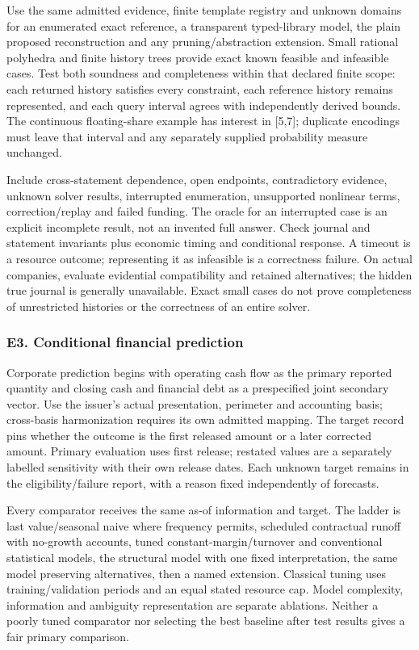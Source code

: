 Use the same admitted evidence, finite template registry and unknown domains for an enumerated exact reference, a transparent typed-library model, the plain proposed reconstruction and any pruning/abstraction extension. Small rational polyhedra and finite history trees provide exact known feasible and infeasible cases. Test both soundness and completeness within that declared finite scope: each returned history satisfies every constraint, each reference history remains represented, and each query interval agrees with independently derived bounds. The continuous floating-share example has interest in {[}5,7{]}; duplicate encodings must leave that interval and any separately supplied probability measure unchanged.

Include cross-statement dependence, open endpoints, contradictory evidence, unknown solver results, interrupted enumeration, unsupported nonlinear terms, correction/replay and failed funding. The oracle for an interrupted case is an explicit incomplete result, not an invented full answer. Check journal and statement invariants plus economic timing and conditional response. A timeout is a resource outcome; representing it as infeasible is a correctness failure. On actual companies, evaluate evidential compatibility and retained alternatives; the hidden true journal is generally unavailable. Exact small cases do not prove completeness of unrestricted histories or the correctness of an entire solver.

\hypertarget{e3.-conditional-financial-prediction}{%
\subsubsection{E3. Conditional financial prediction}\label{e3.-conditional-financial-prediction}}

Corporate prediction begins with operating cash flow as the primary reported quantity and closing cash and financial debt as a prespecified joint secondary vector. Use the issuer's actual presentation, perimeter and accounting basis; cross-basis harmonization requires its own admitted mapping. The target record pins whether the outcome is the first released amount or a later corrected amount. Primary evaluation uses first release; restated values are a separately labelled sensitivity with their own release dates. Each unknown target remains in the eligibility/failure report, with a reason fixed independently of forecasts.

Every comparator receives the same as-of information and target. The ladder is last value/seasonal naive where frequency permits, scheduled contractual runoff with no-growth accounts, tuned constant-margin/turnover and conventional statistical models, the structural model with one fixed interpretation, the same model preserving alternatives, then a named extension. Classical tuning uses training/validation periods and an equal stated resource cap. Model complexity, information and ambiguity representation are separate ablations. Neither a poorly tuned comparator nor selecting the best baseline after test results gives a fair primary comparison.

